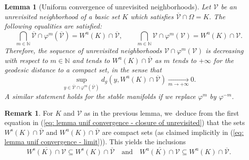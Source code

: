 \documentclass[11pt]{article}
\newcommand{\rs}{\mathrm{s}}
\newcommand{\ru}{\mathrm{u}}
\theoremstyle{definition}
\newtheorem{remark}[definition]{Remark}
\theoremstyle{plain}
\newtheorem{lemma}[definition]{Lemma}
\newcommand{\N}{\mathbb{N}}
\newcommand{\Vcal}{\mathcal{V}}
\begin{document}
\begin{lemma}[Uniform convergence of unrevisited neighborhoods]\label{lemme: cv nonrevisite vers variete stable et instable}
Let $\Vcal$ be an unrevisited neighborhood of a basic set $K$ which satisfies $\overline{\Vcal} \cap \Omega = K$. The following equalities are satisfied:
\begin{equation}\label{eq: lemma unif convergence - closure of unrevisited}
\bigcap_{m \in \N} \overline{\Vcal} \cap \varphi^m (\overline{\Vcal}) = W^\ru (K) \cap \overline{\Vcal}, \qquad \bigcap_{m \in \N} \Vcal \cap \varphi^m (\Vcal) = W^\ru (K) \cap \Vcal.
\end{equation}
Therefore, the sequence of unrevisited neighborhoods $\Vcal \cap \varphi^m (\Vcal)$ is decreasing with respect to $m \in \N$ and tends to $W^\ru (K) \cap \overline{\Vcal}$ as $m$ tends to $+ \infty$ for the geodesic distance to a compact set, in the sense that
\begin{equation}\label{eq: lemma unif convergence - limit}
\sup_{y \in \overline{\Vcal} \cap \varphi^{m} (\overline{\Vcal})} d_g \left(y, W^{\ru} (K) \cap \overline{\Vcal} \right) \underset{m \to + \infty}{\to} 0.
\end{equation}
A similar statement holds for the stable manifolds if we replace $\varphi^{m}$ by $\varphi^{-m}$.
\end{lemma}

\begin{remark}\label{lemma: clos. of stable man on unrevisited neigh.}
For $K$ and $\Vcal$ as in the previous lemma, we~deduce from the first equation in (\ref{eq: lemma unif convergence - closure of unrevisited}) that the sets $ W^\rs (K) \cap \overline{\Vcal} $ and $W^\ru (K) \cap \overline{\Vcal} $ are compact sets (as claimed implicitly in (\ref{eq: lemma unif convergence - limit})). This yields the inclusions
\[
\overline{W^\rs (K) \cap \Vcal} \subseteq W^\rs (K) \cap \overline{\Vcal} \quad \text{and} \quad \overline{W^\ru (K) \cap \Vcal} \subseteq W^\ru (K) \cap \overline{\Vcal}.
\]
\end{remark}
\end{document}
